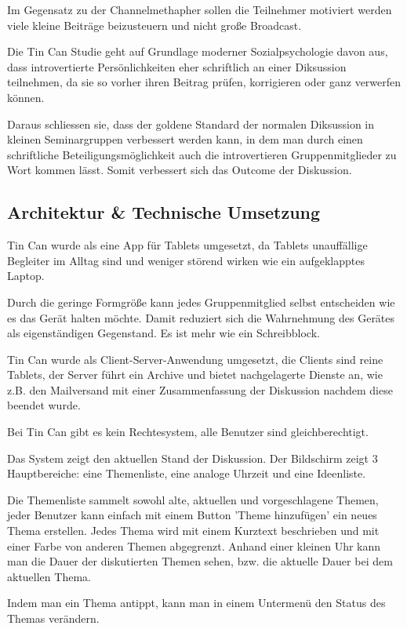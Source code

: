 Im Gegensatz zu der Channelmethapher sollen die Teilnehmer motiviert werden
viele kleine Beiträge beizusteuern und nicht große Broadcast.

Die Tin Can Studie geht auf Grundlage moderner Sozialpsychologie davon aus, dass
introvertierte Persönlichkeiten eher schriftlich an einer Diksussion teilnehmen,
da sie so vorher ihren Beitrag prüfen, korrigieren oder ganz verwerfen können.

Daraus schliessen sie, dass der goldene Standard der normalen Diksussion in
kleinen Seminargruppen verbessert werden kann, in dem man durch einen
schriftliche Beteiligungsmöglichkeit auch die introvertieren Gruppenmitglieder
zu Wort kommen lässt. Somit verbessert sich das Outcome der Diskussion.
 
\subsection{Architektur \& Technische Umsetzung}
Tin Can wurde als eine App für Tablets umgesetzt, da Tablets unauffällige
Begleiter im Alltag sind und weniger störend wirken wie ein aufgeklapptes
Laptop.

Durch die geringe Formgröße kann jedes Gruppenmitglied selbst
entscheiden wie es das Gerät halten möchte. Damit reduziert sich die
Wahrnehmung des Gerätes als eigenständigen Gegenstand. Es ist mehr wie ein
Schreibblock.

Tin Can wurde als Client-Server-Anwendung umgesetzt, die Clients sind reine
Tablets, der Server führt ein Archive und bietet nachgelagerte Dienste an, wie
z.B. den Mailversand mit einer Zusammenfassung der Diskussion nachdem diese
beendet wurde.

Bei Tin Can gibt es kein Rechtesystem, alle Benutzer sind gleichberechtigt.

Das System zeigt den aktuellen Stand der Diskussion. Der Bildschirm zeigt 3
Hauptbereiche: eine Themenliste, eine analoge Uhrzeit und eine Ideenliste.

Die Themenliste sammelt sowohl alte, aktuellen und vorgeschlagene Themen, jeder
Benutzer kann einfach mit einem Button 'Theme hinzufügen' ein neues Thema
erstellen. Jedes Thema wird mit einem Kurztext beschrieben und mit einer Farbe
von anderen Themen abgegrenzt. Anhand einer kleinen Uhr kann man die Dauer der
diskutierten Themen sehen, bzw. die aktuelle Dauer bei dem aktuellen Thema.

Indem man ein Thema antippt, kann man in einem Untermenü den Status des Themas
verändern.


